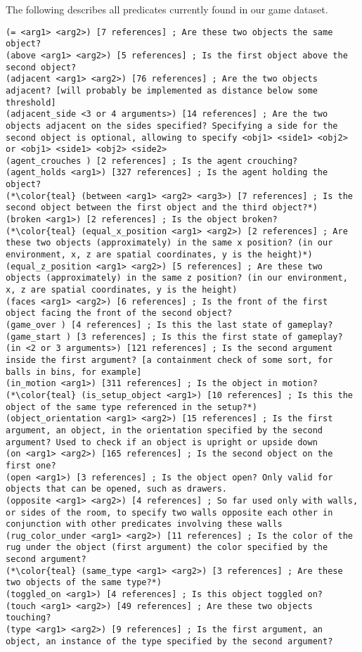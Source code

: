 \documentclass{article}
\begin{document}
            The following describes all predicates currently found in our game dataset. 
        
\begin{lstlisting}
(= <arg1> <arg2>) [7 references] ; Are these two objects the same object?
(above <arg1> <arg2>) [5 references] ; Is the first object above the second object?
(adjacent <arg1> <arg2>) [76 references] ; Are the two objects adjacent? [will probably be implemented as distance below some threshold]
(adjacent_side <3 or 4 arguments>) [14 references] ; Are the two objects adjacent on the sides specified? Specifying a side for the second object is optional, allowing to specify <obj1> <side1> <obj2> or <obj1> <side1> <obj2> <side2>
(agent_crouches ) [2 references] ; Is the agent crouching?
(agent_holds <arg1>) [327 references] ; Is the agent holding the object?
(*\color{teal} (between <arg1> <arg2> <arg3>) [7 references] ; Is the second object between the first object and the third object?*)
(broken <arg1>) [2 references] ; Is the object broken?
(*\color{teal} (equal_x_position <arg1> <arg2>) [2 references] ; Are these two objects (approximately) in the same x position? (in our environment, x, z are spatial coordinates, y is the height)*)
(equal_z_position <arg1> <arg2>) [5 references] ; Are these two objects (approximately) in the same z position? (in our environment, x, z are spatial coordinates, y is the height)
(faces <arg1> <arg2>) [6 references] ; Is the front of the first object facing the front of the second object?
(game_over ) [4 references] ; Is this the last state of gameplay?
(game_start ) [3 references] ; Is this the first state of gameplay?
(in <2 or 3 arguments>) [121 references] ; Is the second argument inside the first argument? [a containment check of some sort, for balls in bins, for example]
(in_motion <arg1>) [311 references] ; Is the object in motion?
(*\color{teal} (is_setup_object <arg1>) [10 references] ; Is this the object of the same type referenced in the setup?*)
(object_orientation <arg1> <arg2>) [15 references] ; Is the first argument, an object, in the orientation specified by the second argument? Used to check if an object is upright or upside down
(on <arg1> <arg2>) [165 references] ; Is the second object on the first one?
(open <arg1>) [3 references] ; Is the object open? Only valid for objects that can be opened, such as drawers.
(opposite <arg1> <arg2>) [4 references] ; So far used only with walls, or sides of the room, to specify two walls opposite each other in conjunction with other predicates involving these walls
(rug_color_under <arg1> <arg2>) [11 references] ; Is the color of the rug under the object (first argument) the color specified by the second argument?
(*\color{teal} (same_type <arg1> <arg2>) [3 references] ; Are these two objects of the same type?*)
(toggled_on <arg1>) [4 references] ; Is this object toggled on?
(touch <arg1> <arg2>) [49 references] ; Are these two objects touching?
(type <arg1> <arg2>) [9 references] ; Is the first argument, an object, an instance of the type specified by the second argument?
\end{lstlisting}
\end{document}
